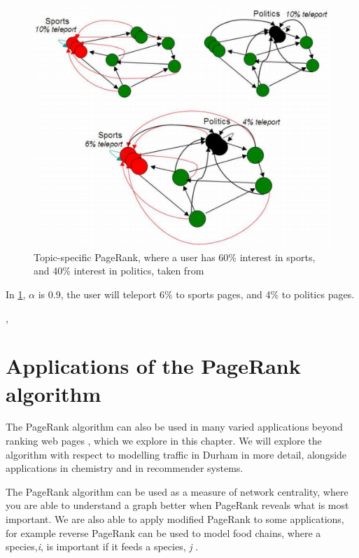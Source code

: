 \documentclass[11pt]{report}
\begin{document}
\begin{figure}[H]
\centering
\includegraphics[width=\linewidth]{Topic-specific_PageRank_Manning.png}
\caption{Topic-specific PageRank, where a user has 60\% interest in sports, and 40\% interest in politics, taken from \cite{manning}}
\label{topic-specific}
\end{figure}

In \ref{topic-specific}, $\alpha$ is 0.9, the user will teleport 6\% to sports pages, and 4\% to politics pages.


\cite{haveliwala1999efficient}, \cite{haveliwala2002topic}



\chapter{Applications of the PageRank algorithm}

The PageRank algorithm can also be used in many varied applications beyond ranking web pages \cite{gleich2015pagerank}, which we explore in this chapter. We will explore the algorithm with respect to modelling traffic in Durham in more detail, alongside applications in chemistry and in recommender systems. 

The PageRank algorithm can be used as a measure of network centrality, where you are able to understand a graph better when PageRank reveals what is most important. We are also able to apply modified PageRank to some applications, for example reverse PageRank can be used to model food chains, where a species,\textit{i}, is important if it feeds a species, \textit{j} \cite{allesina2009googling}. 
\end{document}
